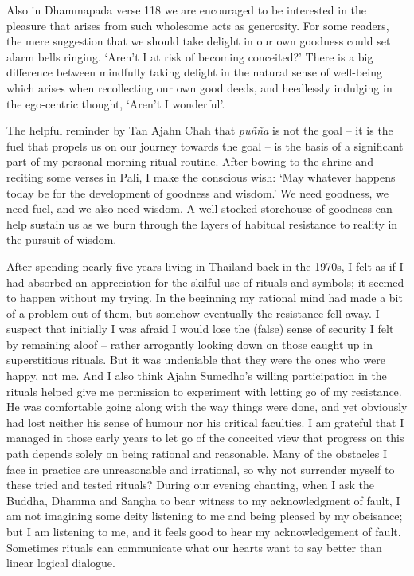Also in Dhammapada verse 118 we are encouraged to be interested in the
pleasure that arises from such wholesome acts as generosity. For some
readers, the mere suggestion that we should take delight in our own
goodness could set alarm bells ringing. `Aren't I at risk of becoming
conceited?' There is a big difference between mindfully taking delight
in the natural sense of well-being which arises when recollecting our
own good deeds, and heedlessly indulging in the ego-centric thought,
`Aren't I wonderful'.

The helpful reminder by Tan Ajahn Chah that \emph{puñña} is not the goal
-- it is the fuel that propels us on our journey towards the goal -- is
the basis of a significant part of my personal morning ritual routine.
After bowing to the shrine and reciting some verses in Pali, I make the
conscious wish: `May whatever happens today be for the development of
goodness and wisdom.' We need goodness, we need fuel, and we also need
wisdom. A well-stocked storehouse of goodness can help sustain us as we burn
through the layers of habitual resistance to reality in the pursuit of
wisdom.

After spending nearly five years living in Thailand back in the 1970s, I
felt as if I had absorbed an appreciation for the skilful use of rituals
and symbols; it seemed to happen without my trying. In the beginning my
rational mind had made a bit of a problem out of them, but somehow
eventually the resistance fell away. I suspect that initially I was
afraid I would lose the (false) sense of security I felt by remaining
aloof -- rather arrogantly looking down on those caught up in
superstitious rituals. But it was undeniable that they were the ones who
were happy, not me. And I also think Ajahn Sumedho's willing
participation in the rituals helped give me permission to experiment
with letting go of my resistance. He was comfortable going along with
the way things were done, and yet obviously had lost neither his sense
of humour nor his critical faculties. I am grateful that I managed in
those early years to let go of the conceited view that progress on this
path depends solely on being rational and reasonable. Many of the
obstacles I face in practice are unreasonable and irrational, so why not
surrender myself to these tried and tested rituals? During our evening
chanting, when I ask the Buddha, Dhamma and Sangha to bear witness to my
acknowledgment of fault, I am not imagining some deity listening to me
and being pleased by my obeisance; but I am listening to me, and
it feels good to hear my acknowledgement of fault. Sometimes rituals can
communicate what our hearts want to say better than linear logical
dialogue.

